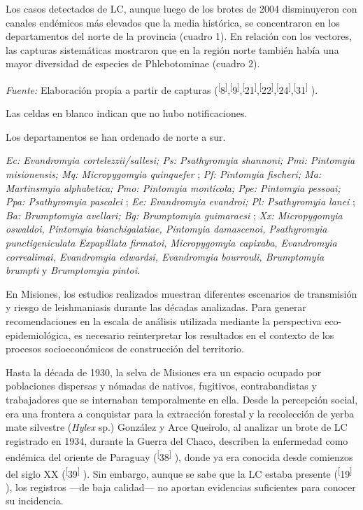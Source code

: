 \documentclass{article}
\begin{document}
Los casos detectados de LC, aunque luego de los brotes de 2004 disminuyeron con
canales endémicos más elevados que la media histórica, se concentraron en los
departamentos del norte de la provincia (cuadro 1). En relación con los
vectores, las capturas sistemáticas mostraron que en la región norte también
había una mayor diversidad de especies de Phlebotominae (cuadro 2).

\textit{Fuente:}
Elaboración propia a partir de capturas (\textsuperscript{[}8\textsuperscript{]},\textsuperscript{[}9\textsuperscript{]},\textsuperscript{[}21\textsuperscript{]},\textsuperscript{[}22\textsuperscript{]},\textsuperscript{[}24\textsuperscript{]},\textsuperscript{[}31\textsuperscript{]}
).

Las celdas en blanco indican que no hubo notificaciones.

Los departamentos se han ordenado de norte a sur.

\textit{Ec: Evandromyia cortelezzii/sallesi; Ps: Psathyromyia shannoni; Pmi:
Pintomyia misionensis; Mq: Micropygomyia quinquefer}
; \textit{Pf: Pintomyia fischeri; Ma: Martinsmyia alphabetica; Pmo: Pintomyia
montícola; Ppe: Pintomyia pessoai; Ppa: Psathyromyia pascalei}
; \textit{Ee: Evandromyia evandroi; Pl: Psathyromyia lanei}
; \textit{Ba: Brumptomyia avellari; Bg: Brumptomyia guimaraesi}
; \textit{Xx: Micropygomyia oswaldoi, Pintomyia bianchigalatiae, Pintomyia
damascenoi, Psathyromyia punctigeniculata Expapillata firmatoi, Micropygomyia
capixaba, Evandromyia correalimai, Evandromyia edwardsi, Evandromyia bourrouli,
Brumptomyia brumpti}
y \textit{Brumptomyia pintoi.}

En Misiones, los estudios realizados muestran diferentes escenarios de
transmisión y riesgo de leishmaniasis durante las décadas analizadas. Para
generar recomendaciones en la escala de análisis utilizada mediante la
perspectiva eco-epidemiológica, es necesario reinterpretar los resultados en el
contexto de los procesos socioeconómicos de construcción del territorio.

Hasta la década de 1930, la selva de Misiones era un espacio ocupado por
poblaciones dispersas y nómadas de nativos, fugitivos, contrabandistas y
trabajadores que se internaban temporalmente en ella. Desde la percepción
social, era una frontera a conquistar para la extracción forestal y la
recolección de yerba mate silvestre (\textit{Hylex}
sp.) González y Arce Queirolo, al analizar un brote de LC registrado en 1934,
durante la Guerra del Chaco, describen la enfermedad como endémica del oriente
de Paraguay (\textsuperscript{[}38\textsuperscript{]}
), donde ya era conocida desde comienzos del siglo XX
(\textsuperscript{[}39\textsuperscript{]}
). Sin embargo, aunque se sabe que la LC estaba presente
(\textsuperscript{[}19\textsuperscript{]}
), los registros —de baja calidad— no aportan evidencias suficientes para
conocer su incidencia.
\end{document}
